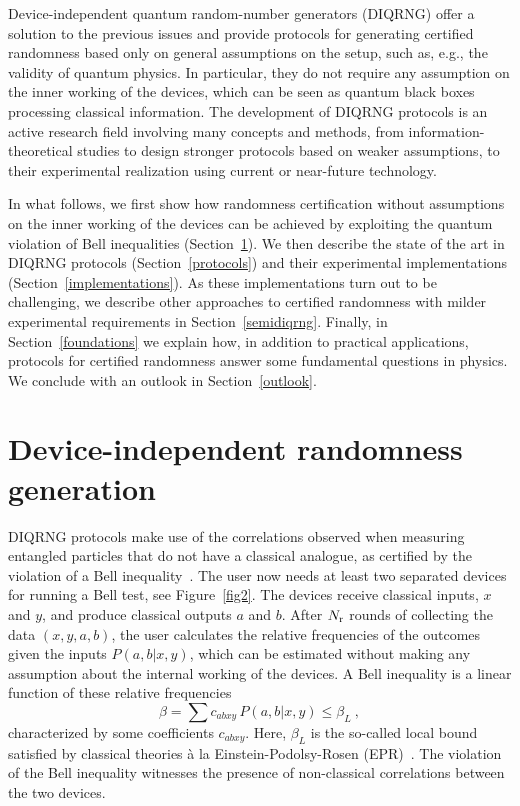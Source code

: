 \documentclass[11pt,a4paper]{article}
\begin{document}
Device-independent quantum random-number generators (DIQRNG) offer a
solution to the previous issues and provide protocols for generating certified randomness
based only on general assumptions on the setup, such as, e.g., the validity of quantum physics. In particular,
they do not require any assumption on the inner working of the devices, which can be seen as quantum black boxes processing classical information. The development of DIQRNG protocols is an active
research field involving many concepts and methods, from information-theoretical studies to design stronger
protocols based on weaker assumptions, to their experimental realization using current or near-future technology.

In what follows, we first show how randomness certification without assumptions on the inner working of the devices can be achieved by exploiting the quantum violation of Bell inequalities (Section~\ref{diqrng}).
We then describe the state of the art in DIQRNG protocols (Section~\ref{protocols}) and their experimental implementations (Section~\ref{implementations}). %
As these implementations turn out to be challenging, we describe other approaches to certified randomness with milder experimental requirements in Section~\ref{semidiqrng}. Finally, in Section~\ref{foundations} we explain how, in addition to practical applications, protocols for certified randomness answer some fundamental questions in physics. We conclude with an outlook in Section~\ref{outlook}.

\section{Device-independent randomness generation}
\label{diqrng}

DIQRNG protocols make use of the correlations
observed when measuring entangled particles that do not have a
classical analogue, as certified by the violation of a Bell
inequality~\cite{Bell}. The user now needs at least two separated devices for running a
Bell test, see Figure~\ref{fig2}. The devices receive classical
inputs, $x$ and $y$, and produce classical outputs $a$ and
$b$.
After $N_{\rm r}$ rounds of collecting the data $(x,y,a,b)$, the user calculates the relative frequencies of the outcomes given the inputs $P(a,b|x,y)$, which can be estimated without making any assumption about the internal working of the devices.
A Bell inequality is a linear function of these relative frequencies
\begin{equation}
  \label{Bell inequality}
\beta=\sum c_{abxy}\, P(a,b|x,y)
  \leq \beta_L
  \ ,
\end{equation}
characterized by some coefficients $c_{abxy}$.
Here, $\beta_L$ is the so-called
local bound satisfied by classical theories \`a la Einstein-Podolsy-Rosen (EPR)~\cite{epr}. The violation of the Bell
inequality witnesses the presence of non-classical correlations between the two devices.
\end{document}
